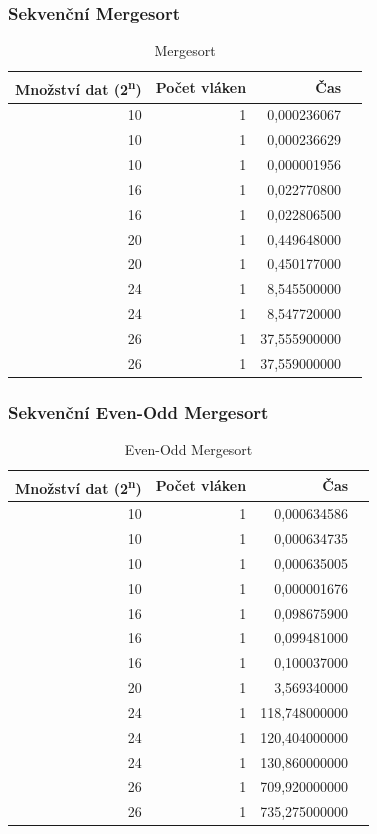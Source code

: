 \documentclass[12pt]{article}
\begin{document}
\subsubsection{Sekvenční Mergesort}
\begin{table}[H]
\begin{center}
\begin{tabular}{|r|r|r|r|}
\hline Množství dat (2\textsuperscript{n}) & Počet vláken & Čas \\ \hline
10 & 1 &  0,000236067 \\ \hline
10 & 1 &  0,000236629 \\ \hline
10 & 1 &  0,000001956 \\ \hline
16 & 1 &  0,022770800 \\ \hline
16 & 1 &  0,022806500 \\ \hline
20 & 1 &  0,449648000 \\ \hline
20 & 1 &  0,450177000 \\ \hline
24 & 1 &  8,545500000 \\ \hline
24 & 1 &  8,547720000 \\ \hline
26 & 1 &  37,555900000 \\ \hline
26 & 1 &  37,559000000 \\ \hline
\end{tabular} 
\end{center}
\caption{Mergesort}
\end{table}

\subsubsection{Sekvenční Even-Odd Mergesort}
\begin{table}[H]
\begin{center}
\begin{tabular}{|r|r|r|r|}
\hline Množství dat (2\textsuperscript{n}) & Počet vláken & Čas \\ \hline
10  & 1 & 0,000634586  \\ \hline
10  & 1 & 0,000634735  \\ \hline
10  & 1 & 0,000635005  \\ \hline
10  & 1 & 0,000001676  \\ \hline
16  & 1 & 0,098675900  \\ \hline
16  & 1 & 0,099481000  \\ \hline
16  & 1 & 0,100037000  \\ \hline
20  & 1 & 3,569340000  \\ \hline
24  & 1 & 118,748000000  \\ \hline
24  & 1 & 120,404000000  \\ \hline
24  & 1 & 130,860000000  \\ \hline
26  & 1 & 709,920000000  \\ \hline
26  & 1 & 735,275000000  \\ \hline
\end{tabular} 
\end{center}
\caption{Even-Odd Mergesort}
\end{table}
\end{document}
